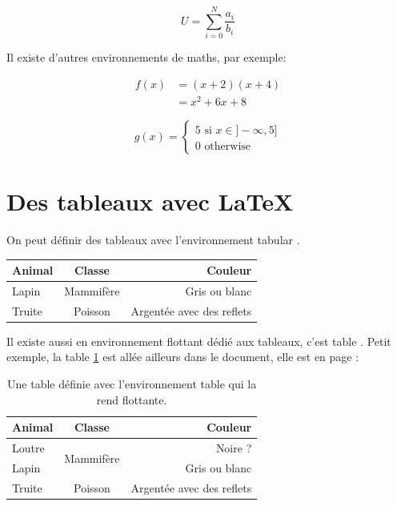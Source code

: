 \documentclass[10pt,a4paper]{article}
\begin{document}
\begin{equation}
	U = \sum_{i=0}^N \dfrac{a_i}{b_i}
	\label{eq:awesome_equation}
\end{equation}

Il existe d'autres environnements de maths, par exemple:

\begin{align}
	f(x) & = (x+2)(x+4)   \\
	     & = x^2 + 6x + 8 
\end{align}

\begin{equation}
	g(x) = \left\lbrace 
	\begin{split}
		5 \mbox{ si } x \in ]-\infty, 5] \\
		0 \mbox{ otherwise }	
	\end{split}	
	\right.
\end{equation}

\section{Des tableaux avec \LaTeX}

On peut définir des tableaux avec l'environnement \og tabular \fg. 


\begin{tabular}{lcr}
	\toprule
	\textbf{Animal} & \textbf{Classe} & \textbf{Couleur}           \\
	\midrule
	Lapin           & Mammifère      & Gris ou blanc              \\
	Truite          & Poisson         & Argentée avec des reflets \\
	\bottomrule
\end{tabular}

Il existe aussi en environnement flottant dédié aux tableaux, c'est \og table \fg. Petit exemple, la table \ref {tab:my_tab} est allée ailleurs dans le document, elle est en page \pageref{tab:my_tab}:

\blindtext[5] %

\begin{table}
	\begin{center}
		\begin{tabular}{lcr}
			\toprule
			\textbf{Animal} & \textbf{Classe} & \textbf{Couleur}           \\
			\midrule
			Loutre & \multirow{2}{*}{Mammifère} & Noire ? \\			
			Lapin           &  & Gris ou blanc              \\
			Truite          & Poisson         & Argentée avec des reflets \\
			\bottomrule
		\end{tabular}
		\caption{Une table définie avec l'environnement table qui la rend flottante.}
		\label{tab:my_tab}
	  \end{center}
	\end{table}
	
\end{document}
